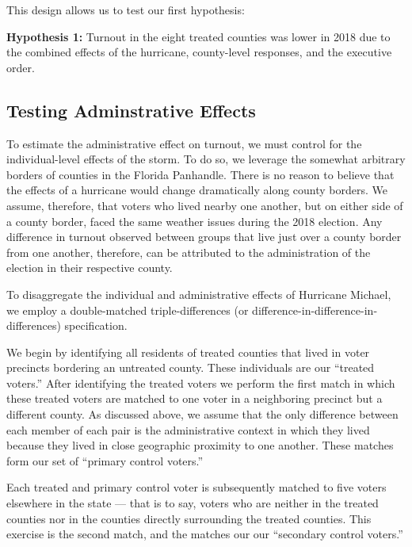 \documentclass[
  12pt,
]{article}
\begin{document}
This design allows us to test our first hypothesis:

\textbf{Hypothesis 1:} Turnout in the eight treated counties was lower in 2018 due to the combined effects of the hurricane, county-level responses, and the executive order.

\hypertarget{testing-adminstrative-effects}{%
\subsection*{Testing Adminstrative Effects}\label{testing-adminstrative-effects}}

To estimate the administrative effect on turnout, we must control for the individual-level effects of the storm. To do so, we leverage the somewhat arbitrary borders of counties in the Florida Panhandle. There is no reason to believe that the effects of a hurricane would change dramatically along county borders. We assume, therefore, that voters who lived nearby one another, but on either side of a county border, faced the same weather issues during the 2018 election. Any difference in turnout observed between groups that live just over a county border from one another, therefore, can be attributed to the administration of the election in their respective county.

To disaggregate the individual and administrative effects of Hurricane Michael, we employ a double-matched triple-differences (or difference-in-difference-in-differences) specification.

We begin by identifying all residents of treated counties that lived in voter precincts bordering an untreated county. These individuals are our ``treated voters.'' After identifying the treated voters we perform the first match in which these treated voters are matched to one voter in a neighboring precinct but a different county. As discussed above, we assume that the only difference between each member of each pair is the administrative context in which they lived because they lived in close geographic proximity to one another. These matches form our set of ``primary control voters.''

Each treated and primary control voter is subsequently matched to five voters elsewhere in the state --- that is to say, voters who are neither in the treated counties nor in the counties directly surrounding the treated counties. This exercise is the second match, and the matches our our ``secondary control voters.''
\end{document}
